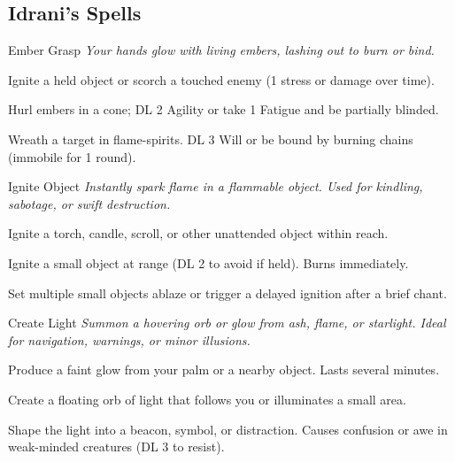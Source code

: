 \begin{multicols}{2}
\section*{Idrani's Spells}
\begin{WyrdSpell}[Ashcraft]{Ember Grasp}
    \textit{Your hands glow with living embers, lashing out to burn or bind.}
    
    \begin{WyrdSpellBlock}
        \item[+1] Ignite a held object or scorch a touched enemy (1 stress or damage over time).
        \item[+2] Hurl embers in a cone; DL 2 Agility or take 1 Fatigue and be partially blinded.
        \item[+3] Wreath a target in flame-spirits. DL 3 Will or be bound by burning chains (immobile for 1 round).
    \end{WyrdSpellBlock}
\end{WyrdSpell}

\begin{WyrdSpell}[Elemental]{Ignite Object}
    \textit{Instantly spark flame in a flammable object. Used for kindling, sabotage, or swift destruction.}
    
    \begin{WyrdSpellBlock}
        \item[+1] Ignite a torch, candle, scroll, or other unattended object within reach.
        \item[+2] Ignite a small object at range (DL 2 to avoid if held). Burns immediately.
        \item[+3] Set multiple small objects ablaze or trigger a delayed ignition after a brief chant.
    \end{WyrdSpellBlock}
\end{WyrdSpell}

\begin{WyrdSpell}[Elemental]{Create Light}
    \textit{Summon a hovering orb or glow from ash, flame, or starlight. Ideal for navigation, warnings, or minor illusions.}
    
    \begin{WyrdSpellBlock}
        \item[+1] Produce a faint glow from your palm or a nearby object. Lasts several minutes.
        \item[+2] Create a floating orb of light that follows you or illuminates a small area.
        \item[+3] Shape the light into a beacon, symbol, or distraction. Causes confusion or awe in weak-minded creatures (DL 3 to resist).
    \end{WyrdSpellBlock}
\end{WyrdSpell}


\end{multicols}
